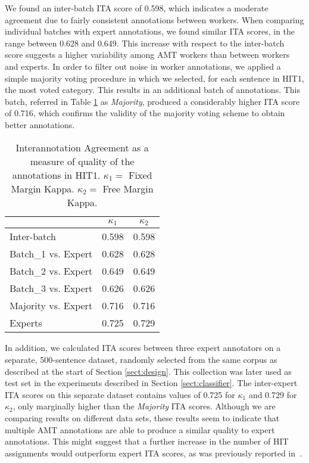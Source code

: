 \documentclass[11pt]{elsarticle}
\begin{document}
We found an inter-batch ITA score of 0.598, which indicates a moderate agreement due to fairly consistent annotations between workers. When comparing individual batches with expert annotations, we found similar ITA scores, in the range between 0.628 and 0.649. This increase with respect to the inter-batch score suggests a higher variability among AMT workers than between workers and experts.
In order to filter out noise in worker annotations, we applied a simple majority voting procedure in which we selected, for each sentence in HIT1, the most voted category. This results in an additional batch of annotations. This batch, referred in Table \ref{tablita} as \textit{Majority}, produced a considerably higher ITA score of 0.716, which confirms the validity of the majority voting scheme to obtain better annotations.

\begin{table}[h]
\begin{center}
\begin{tabular}{|l|c|c|}
\hline
& $\kappa_{1}$ & $\kappa_{2}$ \\
\hline
Inter-batch & 0.598 & 0.598 \\ \hline
Batch\_1 vs. Expert & 0.628 & 0.628\\
Batch\_2 vs. Expert & 0.649 & 0.649\\
Batch\_3 vs. Expert & 0.626 & 0.626\\ \hline
Majority vs. Expert & 0.716 & 0.716\\ \hline
Experts& 0.725 & 0.729\\ \hline
\end{tabular}
\end{center}
\caption{Interannotation Agreement as a measure of quality of the annotations in HIT1. $\kappa_{1} = $ Fixed Margin Kappa. $\kappa_{2} = $ Free Margin Kappa.}
\label{tablita}
\end{table}

In addition, we calculated ITA scores between three expert annotators on a separate, 500-sentence dataset, randomly selected from the same corpus as described at the start of Section \ref{sect:design}. This collection was later used as test set in the experiments described in Section \ref{sect:classifier}. The inter-expert ITA scores on this separate dataset contains values of 0.725 for $\kappa_{1}$ and 0.729 for $\kappa_{2}$, only marginally higher than the \textit{Majority} ITA scores. Although we are comparing results on different data sets, these results seem to indicate that multiple AMT annotations are able to produce a similar quality to expert annotations. This might suggest that a further increase in the number of HIT assignments would outperform expert ITA scores, as was previously reported in~\cite{snow_cheap_2008}.
\end{document}
